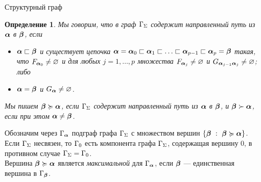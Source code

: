 \documentclass[aspectratio=1610, 10pt, notheorems]{beamer}
\newtheorem{lemma}       {Лемма}
\newtheorem{definition}  {Определение}
\begin{document}
\begin{frame}{Структурный граф}
\end{frame}


\begin{frame}{}
\begin{definition}
Мы говорим, что в граф $\Gamma_\Sigma$  содержит  {\em направленный путь из ${\bm{\alpha}}$ в ${\bm{\beta}}$}, если 
\begin{itemize}[nolistsep]
\item[1.] ${\bm{\alpha}}\sqsubset{\bm{\beta}}$ и существует цепочка ${\bm{\alpha}}={\bm{\alpha}}_0\sqsubset{\bm{\alpha}}_1\sqsubset\ldots\sqsubset{\bm{\alpha}}_{p-1}\sqsubset{\bm{\alpha}}_p={\bm{\beta}}$ такая, что $F_{{\bm{\alpha}}_0}\neq\varnothing$ и для любых  $j=1, \ldots, p$ множества $F_{{\bm{\alpha}}_j}\neq\varnothing$  и  $G_{{\bm{\alpha}}_{j-1}{\bm{\alpha}}_j}\neq\varnothing$; либо
\item[2.] ${\bm{\alpha}}={\bm{\beta}}$ и  $G_{{\bm{\alpha}}}\neq\varnothing$.
\end{itemize}
Мы пишем ${\bm{\beta}}\succcurlyeq{\bm{\alpha}}$, если  $\Gamma_\Sigma$ содержит направленный путь из ${\bm{\alpha}}$ в ${\bm{\beta}}$, и ${\bm{\beta}}\succ{\bm{\alpha}}$, если при этом ${\bm{\alpha}}\neq{\bm{\beta}}$.
\end{definition}
 
Обозначим через $\Gamma_{\bm{\alpha}}$ подграф графа $\Gamma_\Sigma$ с множеством вершин $\{\bmb\ :\ \bmb\succcurlyeq\bma\}$.\\
Если $\Gamma_\Sigma$ несвязен, то $\Gamma_0$ есть компонента графа $\Gamma_\Sigma$, содержащая вершину $0$, в противном случае $\Gamma_\Sigma=\Gamma_0$.\\
Вершина ${\bm{\beta}}\succcurlyeq{\bm{\alpha}}$ является {\em максимальной} для $\Gamma_{\bm{\alpha}}$, если ${\bm{\beta}}$ --- единственная вершина в $\Gamma_{\bm{\beta}}$.
\end{frame}
\end{document}

